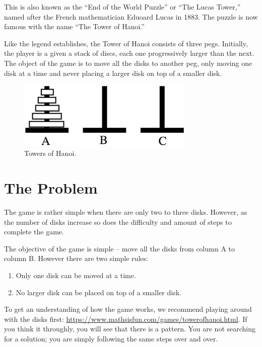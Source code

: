 \documentclass[11pt]{article}
\begin{document}
This is also known as the ``End of the World Puzzle'' or ``The Lucas Tower,'' named after the French mathematician Eduoard Lucas in 1883. The puzzle is now famous with the name ``The Tower of Hanoi.''

Like the legend establishes, the Tower of Hanoi consists of three
pegs. Initially, the player is a given a stack of discs, each one
progressively larger than the next. The object of the game is to
move all the disks to another peg, only moving one disk at a time
and never placing a larger disk on top of a smaller disk.

\begin{figure}[tb]
\begin{centering}
\includegraphics[width=0.75\textwidth]{towers}
\caption{Towers of Hanoi.}\label{tower}
\end{centering}
\end{figure}



\section{The Problem}
The game is rather simple when there are only two to three disks. However, as the number of disks increase so does the difficulty and amount of steps to complete the game.

The objective of the game is simple -- move all the disks from column A to column B. However there are two simple rules:

\begin{enumerate}
  \item Only one disk can be moved at a time.
  \item No larger disk can be placed on top of a smaller disk.
\end{enumerate}

To get an understanding of how the game works, we recommend playing around with the disks first:
\url{https://www.mathsisfun.com/games/towerofhanoi.html}.
If you think it throughly, you will see that there is a pattern. You are not searching for a solution; you are simply following the same steps over and over.
\end{document}
